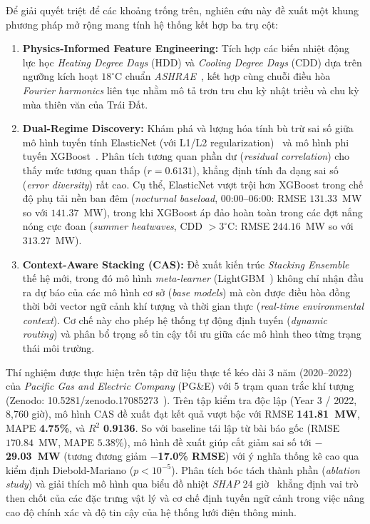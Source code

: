 Để giải quyết triệt để các khoảng trống trên, nghiên cứu này đề xuất một khung phương pháp mở rộng mang tính hệ thống kết hợp ba trụ cột:
\begin{enumerate}
    \item \textbf{Physics-Informed Feature Engineering:} Tích hợp các biến nhiệt động lực học \textit{Heating Degree Days} (HDD) và \textit{Cooling Degree Days} (CDD) dựa trên ngưỡng kích hoạt $18^\circ\text{C}$ chuẩn \textit{ASHRAE}~\cite{ashrae2021fundamentals}, kết hợp cùng chuỗi điều hòa \textit{Fourier harmonics} liên tục nhằm mô tả trơn tru chu kỳ nhật triều và chu kỳ mùa thiên văn của Trái Đất.
    \item \textbf{Dual-Regime Discovery:} Khám phá và lượng hóa tính bù trừ sai số giữa mô hình tuyến tính ElasticNet (với L1/L2 regularization)~\cite{zou2005regularization} và mô hình phi tuyến XGBoost~\cite{chen2016xgboost}. Phân tích tương quan phần dư (\textit{residual correlation}) cho thấy mức tương quan thấp ($r = 0.6131$), khẳng định tính đa dạng sai số (\textit{error diversity}) rất cao. Cụ thể, ElasticNet vượt trội hơn XGBoost trong chế độ phụ tải nền ban đêm (\textit{nocturnal baseload}, 00:00--06:00: RMSE $131.33$~MW so với $141.37$~MW), trong khi XGBoost áp đảo hoàn toàn trong các đợt nắng nóng cực đoan (\textit{summer heatwaves}, CDD $> 3^\circ\text{C}$: RMSE $244.16$~MW so với $313.27$~MW).
    \item \textbf{Context-Aware Stacking (CAS):} Đề xuất kiến trúc \textit{Stacking Ensemble} thế hệ mới, trong đó mô hình \textit{meta-learner} (LightGBM~\cite{ke2017lightgbm}) không chỉ nhận đầu ra dự báo của các mô hình cơ sở (\textit{base models}) mà còn được điều hòa đồng thời bởi vector ngữ cảnh khí tượng và thời gian thực (\textit{real-time environmental context}). Cơ chế này cho phép hệ thống tự động định tuyến (\textit{dynamic routing}) và phân bổ trọng số tin cậy tối ưu giữa các mô hình theo từng trạng thái môi trường.
\end{enumerate}

Thí nghiệm được thực hiện trên tập dữ liệu thực tế kéo dài 3 năm (2020--2022) của \textit{Pacific Gas and Electric Company} (PG\&E) với 5 trạm quan trắc khí tượng (Zenodo: 10.5281/zenodo.17085273~\cite{pge2025zenodo}). Trên tập kiểm tra độc lập (Year 3 / 2022, 8,760 giờ), mô hình CAS đề xuất đạt kết quả vượt bậc với RMSE \textbf{141.81~MW}, MAPE \textbf{4.75\%}, và $R^2$ \textbf{0.9136}. So với baseline tái lập từ bài báo gốc (RMSE $170.84$~MW, MAPE $5.38\%$), mô hình đề xuất giúp cắt giảm sai số tới \textbf{$-$29.03~MW} (tương đương giảm \textbf{$-$17.0\% RMSE}) với ý nghĩa thống kê cao qua kiểm định Diebold-Mariano ($p < 10^{-5}$). Phân tích bóc tách thành phần (\textit{ablation study}) và giải thích mô hình qua biểu đồ nhiệt \textit{SHAP} 24 giờ~\cite{lundberg2017shap} khẳng định vai trò then chốt của các đặc trưng vật lý và cơ chế định tuyến ngữ cảnh trong việc nâng cao độ chính xác và độ tin cậy của hệ thống lưới điện thông minh.